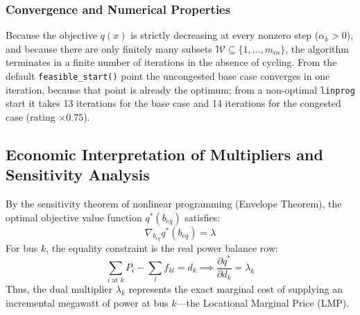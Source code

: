 \subsubsection{Convergence and Numerical Properties}
Because the objective $q(x)$ is strictly decreasing at every nonzero step ($\alpha_k > 0$), and because there are only finitely many subsets $\mathcal{W} \subseteq \{1, \dots, m_{in}\}$, the algorithm terminates in a finite number of iterations in the absence of cycling. From the default \texttt{feasible\_start()} point the uncongested base case converges in one iteration, because that point is already the optimum; from a non-optimal \texttt{linprog} start it takes 13 iterations for the base case and 14 iterations for the congested case (rating $\times 0.75$).

\subsection{Economic Interpretation of Multipliers and Sensitivity Analysis}
\label{sec:lmp_sensitivity}

By the sensitivity theorem of nonlinear programming (Envelope Theorem), the optimal objective value function $q^*(b_{eq})$ satisfies:
\begin{equation}
    \nabla_{b_{eq}} q^*(b_{eq}) = \lambda
\end{equation}
For bus $k$, the equality constraint is the real power balance row:
\begin{equation}
    \sum_{i \text{ at } k} P_i - \sum_{l} f_{kl} = d_k \implies \frac{\partial q^*}{\partial d_k} = \lambda_k
\end{equation}
Thus, the dual multiplier $\lambda_k$ represents the exact marginal cost of supplying an incremental megawatt of power at bus $k$---the Locational Marginal Price (LMP).

